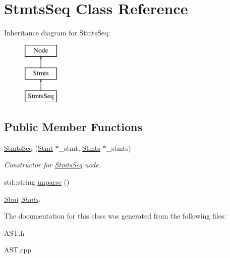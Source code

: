 \hypertarget{classStmtsSeq}{\section{Stmts\-Seq Class Reference}
\label{classStmtsSeq}
}
Inheritance diagram for Stmts\-Seq\-:\begin{figure}[H]
\begin{center}
\leavevmode
\includegraphics[height=3.000000cm]{classStmtsSeq}
\end{center}
\end{figure}
\subsection*{Public Member Functions}
\begin{DoxyCompactItemize}
\item 
\hypertarget{classStmtsSeq_a4712f47aa19254d0c5fdece5c83a8b3a}{\hyperlink{classStmtsSeq_a4712f47aa19254d0c5fdece5c83a8b3a}{Stmts\-Seq} (\hyperlink{classStmt}{Stmt} $\ast$\-\_\-stmt, \hyperlink{classStmts}{Stmts} $\ast$\-\_\-stmts)}\label{classStmtsSeq_a4712f47aa19254d0c5fdece5c83a8b3a}

\begin{DoxyCompactList}\small\item\em Constructor for \hyperlink{classStmtsSeq}{Stmts\-Seq} node. \end{DoxyCompactList}\item 
\hypertarget{classStmtsSeq_ad717a80bb854d28a9621e9921d01ba7f}{std\-::string \hyperlink{classStmtsSeq_ad717a80bb854d28a9621e9921d01ba7f}{unparse} ()}\label{classStmtsSeq_ad717a80bb854d28a9621e9921d01ba7f}

\begin{DoxyCompactList}\small\item\em \hyperlink{classStmt}{Stmt} \hyperlink{classStmts}{Stmts}. \end{DoxyCompactList}\end{DoxyCompactItemize}


The documentation for this class was generated from the following files\-:\begin{DoxyCompactItemize}
\item 
A\-S\-T.\-h\item 
A\-S\-T.\-cpp\end{DoxyCompactItemize}
